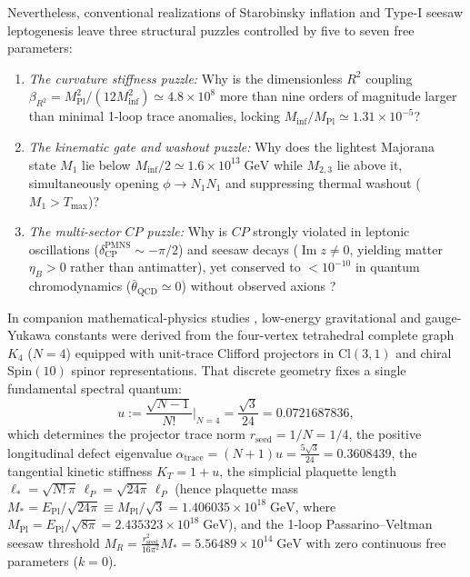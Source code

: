 \documentclass[11pt,a4paper]{article}
\begin{document}
Nevertheless, conventional realizations of Starobinsky inflation and Type-I seesaw leptogenesis leave three structural puzzles controlled by five to seven free parameters:
\begin{enumerate}[label=(\arabic*),leftmargin=1.8em,itemsep=2pt]
\item \emph{The curvature stiffness puzzle:} Why is the dimensionless $R^2$ coupling $\beta_{R^2} = M_{\mathrm{Pl}}^2 / (12 M_{\mathrm{inf}}^2) \simeq 4.8\times 10^8$ more than nine orders of magnitude larger than minimal 1-loop trace anomalies, locking $M_{\mathrm{inf}}/M_{\mathrm{Pl}} \simeq 1.31\times 10^{-5}$?
\item \emph{The kinematic gate and washout puzzle:} Why does the lightest Majorana state $M_1$ lie below $M_{\mathrm{inf}}/2 \simeq 1.6\times 10^{13}\;\mathrm{GeV}$ while $M_{2,3}$ lie above it, simultaneously opening $\phi \to N_1 N_1$ and suppressing thermal washout ($M_1 > T_{\max}$)?
\item \emph{The multi-sector $CP$ puzzle:} Why is $CP$ strongly violated in leptonic oscillations ($\delta_{\mathrm{CP}}^{\mathrm{PMNS}} \sim -\pi/2$) and seesaw decays ($\operatorname{Im}z \neq 0$, yielding matter $\eta_B > 0$ rather than antimatter), yet conserved to $< 10^{-10}$ in quantum chromodynamics ($\bar{\theta}_{\mathrm{QCD}} \simeq 0$) without observed axions \cite{Abel2020nEDM}?
\end{enumerate}

In companion mathematical-physics studies \cite{Olcsak2026Zenodo}, low-energy gravitational and gauge-Yukawa constants were derived from the four-vertex tetrahedral complete graph $K_4$ ($N = 4$) equipped with unit-trace Clifford projectors in $\mathrm{Cl}(3,1)$ and chiral $\mathrm{Spin}(10)$ spinor representations. That discrete geometry fixes a single fundamental spectral quantum:
\begin{equation}
u := \frac{\sqrt{N - 1}}{N!}\Bigg|_{N=4} = \frac{\sqrt{3}}{24} = 0.0721687836,
\label{eq:u-generator}
\end{equation}
which determines the projector trace norm $r_{\mathrm{seed}} = 1/N = 1/4$, the positive longitudinal defect eigenvalue $\alpha_{\mathrm{trace}} = (N+1)u = \frac{5\sqrt{3}}{24} = 0.3608439$, the tangential kinetic stiffness $K_T = 1 + u$, the simplicial plaquette length $\ell_* = \sqrt{N!\,\pi}\,\ell_P = \sqrt{24\pi}\,\ell_P$ (hence plaquette mass $M_* = E_{\mathrm{Pl}}/\sqrt{24\pi} \equiv M_{\mathrm{Pl}}/\sqrt{3} = 1.406035\times 10^{18}\;\mathrm{GeV}$, where $M_{\mathrm{Pl}} = E_{\mathrm{Pl}}/\sqrt{8\pi} = 2.435323\times 10^{18}\;\mathrm{GeV}$), and the 1-loop Passarino--Veltman seesaw threshold $M_R = \frac{r_{\mathrm{seed}}^2}{16\pi^2}M_* = 5.56489\times 10^{14}\;\mathrm{GeV}$ with zero continuous free parameters ($k = 0$).
\end{document}
